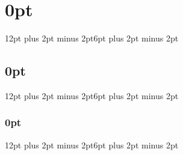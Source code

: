 \usepackage{geometry}
\geometry{
	a4paper,
	left=40mm,
	right=20mm,
	top=20mm,
	bottom=20mm
}


\usepackage[T1]{fontenc}
\usepackage[scaled]{helvet}
\renewcommand*{\familydefault}{\sfdefault}

\usepackage{titlesec}
\titleformat{\section}{\normalfont\fontsize{14}{15}\bfseries}{\thesection}{1em}{}
\titleformat{\subsection}{\normalfont\fontsize{12}{15}\bfseries}{\thesubsection}{1em}{}
\titleformat{\subsubsection}{\normalfont\fontsize{11}{15}\bfseries}{\thesubsubsection}{1em}{}

\setlength{\parindent}{0pt}

\newcommand{\commonlinespread}{1.5}
\newcommand{\toclinespread}{1.0}
\linespread{\commonlinespread}

\usepackage{titlesec}
\titlespacing\section{0pt}{12pt plus 2pt minus 2pt}{6pt plus 2pt minus 2pt}
\titlespacing\subsection{0pt}{12pt plus 2pt minus 2pt}{6pt plus 2pt minus 2pt}
\titlespacing\subsubsection{0pt}{12pt plus 2pt minus 2pt}{6pt plus 2pt minus 2pt}

\newcommand{\changehdrfont}{%
	\fontsize{10}{11}\selectfont
}
\usepackage{fancyhdr}
\pagestyle{fancy}
\fancyhf{} %
\fancyhead[LE,RO]{\changehdrfont\leftmark}
\fancyfoot[LE,RO]{\thepage}

